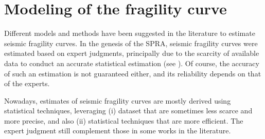 










\section{Modeling of the fragility curve}\label{sec:intro-frags:models}

Different models and methods have been suggested in the literature to estimate seismic fragility curves.
In the genesis of the SPRA, seismic fragility curves were estimated based on expert judgments, principally due to the scarcity of available data to conduct an accurate statistical estimation (see \cite{kennedy_probabilistic_1980}).
Of course, the accuracy of such an estimation is not guaranteed either, and its reliability depends on that of the experts.

Nowadays, estimates of seismic fragility curves are mostly derived using statistical techniques, leveraging (i) dataset that are sometimes less scarce and more precise, and also (ii) statistical techniques that are more efficient. 
The expert judgment still complement those in some works in the literature.


